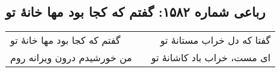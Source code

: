\begin{center}
\section*{رباعی شماره ۱۵۸۲: گفتم که کجا بود مها خانهٔ تو}
\label{sec:1582}
\begin{longtable}{l p{0.5cm} r}
گفتم که کجا بود مها خانهٔ تو
&&
گفتا که دل خراب مستانهٔ تو
\\
من خورشیدم درون ویرانه روم
&&
ای مست، خراب باد کاشانهٔ تو
\\
\end{longtable}
\end{center}
